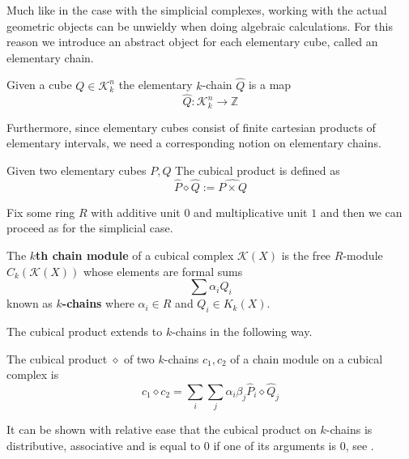 \begin{example}
Much like in the case with the simplicial complexes, working with the actual geometric objects can be unwieldy when doing algebraic calculations. For this reason we introduce an abstract object for each elementary cube, called an elementary chain.
\begin{definition}
  Given a cube $Q \in \mathcal{K}^{n}_{k}$ the elementary $k$-chain $\hat Q$ is a map
  \[\hat Q: \mathcal{K}^{n}_{k} \to \mathbb{Z}\]
\end{definition}

Furthermore, since elementary cubes consist of finite cartesian products of elementary intervals, we need a corresponding notion on elementary chains.

\begin{definition}
Given two elementary cubes $P,Q$ The cubical product is defined as \[\hat P \diamond \hat Q:= \widehat{P \times Q}\]
\end{definition}
Fix some ring $R$ with additive unit $0$ and multiplicative unit $1$ and then we can proceed as for the simplicial case.
\begin{definition}
  The \textbf{$k$th chain module} of a cubical complex $\mathcal{K}(X)$ is the free $R$-module $C_{k}(\mathcal{K}(X))$ whose elements are formal sums
  \[ \sum \alpha_{i} Q_{i}\]
  known as \textbf{$k$-chains} where $\alpha_{i} \in R$ and $Q_{i} \in K_{k}(X)$.
\end{definition}

The cubical product extends to $k$-chains in the following way.

\begin{definition}
The cubical product $\diamond$ of two $k$-chains $c_{1},c_{2}$ of a chain module on a cubical complex is \[ c_{1} \diamond c_{2} = \sum_{i} \sum_{j} \alpha_{i} \beta_{j} \hat P_{i} \diamond  \hat Q_{j}\]
\end{definition}

It can be shown with relative ease that the cubical product on $k$-chains is distributive, associative and is equal to 0 if one of its arguments is 0, see \cite[Proposition 2.25, p. ~51]{kaczynski2004}.


\end{example}
